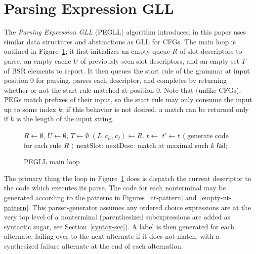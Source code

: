 \documentclass{article}
\newcommand{\fail}{\mathsf{fail}}
\begin{document}
\section{Parsing Expression GLL}
The \emph{Parsing Expression GLL} (PEGLL) algorithm introduced in this paper uses similar data structures and abstractions as GLL for CFGs. 
The main loop is outlined in Figure~\ref{main-loop-algo}; it first initializes an empty queue $R$ of slot descriptors to parse, an empty cache $U$ of previously seen slot descriptors, and an empty set $T$ of BSR elements to report.
It then queues the start rule of the grammar at input position 0 for parsing, parses each descriptor, and completes by returning whether or not the start rule matched at position 0. 
Note that (unlike CFGs), PEGs match prefixes of their input, so the start rule may only consume the input up to some index $k$; if this behavior is not desired, a match can be returned only if $k$ is the length of the input string.

\begin{figure}
\caption{PEGLL main loop} \label{main-loop-algo}
\begin{algorithmic}
\State $R \gets \emptyset$, $U \gets \emptyset$, $T \gets \emptyset$
\State {}
    \State $(L, c_U, c_I) \gets R$.
    \State $t \gets$  $t' \gets t$
    \Loop
            \State $\langle$ generate code for each rule $R$ $\rangle$
        \EndSwitch
    \State nextSlot: \EndLoop
\State nextDesc: \EndWhile
{}
    \State \Return match at maximal such $k$
\Else
    \State \Return $\fail$;
\EndIf
\end{algorithmic}
\end{figure}

The primary thing the loop in Figure~\ref{main-loop-algo} does is dispatch the current descriptor to the code which executes its parse. 
The code for each nonterminal may be generated according to the patterns in Figures~\ref{nt-pattern} and~\ref{empty-nt-pattern}. 
This parser-generator assumes any ordered choice expressions are at the very top level of a nonterminal (parenthesized subexpressions are added as syntactic sugar, see Section~\ref{syntax-sec}). 
A label is then generated for each alternate, failing over to the next alternate if it does not match, with a synthesized failure alternate at the end of each alternation.
\end{document}
